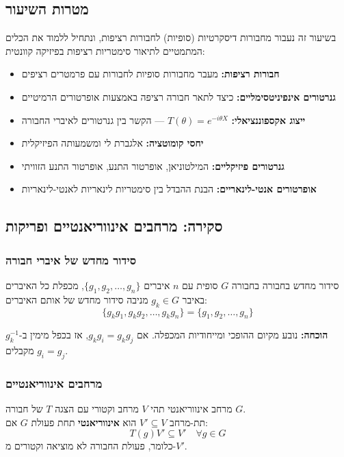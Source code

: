 \subsection*{מטרות השיעור}
בשיעור זה נעבור מחבורות דיסקרטיות (סופיות) לחבורות רציפות, ונתחיל ללמוד את הכלים המתמטיים לתיאור סימטריות רציפות בפיזיקה קוונטית:
\begin{itemize}
    \item \textbf{חבורות רציפות:} מעבר מחבורות סופיות לחבורות עם פרמטרים רציפים
    \item \textbf{גנרטורים אינפיניטסימליים:} כיצד לתאר חבורה רציפה באמצעות אופרטורים הרמיטיים
    \item \textbf{ייצוג אקספוננציאלי:} $T(\theta) = e^{-i\theta X}$ — הקשר בין גנרטורים לאיברי החבורה
    \item \textbf{יחסי קומוטציה:} אלגברת לי ומשמעותה הפיזיקלית
    \item \textbf{גנרטורים פיזיקליים:} המילטוניאן, אופרטור התנע, אופרטור התנע הזוויתי
    \item \textbf{אופרטורים אנטי-לינאריים:} הבנת ההבדל בין סימטריות לינאריות לאנטי-לינאריות
\end{itemize}

\subsection{סקירה: מרחבים אינווריאנטיים ופריקות}

\subsubsection{סידור מחדש של איברי חבורה}

\begin{theorembox}[label=thm:rearrangement]{סידור מחדש בחבורה}
בחבורה $G$ סופית עם $n$ איברים $\{g_1, g_2, \ldots, g_n\}$, מכפלת כל האיברים באיבר $g_k \in G$ מניבה סידור מחדש של אותם האיברים:
\[
\{g_k g_1, g_k g_2, \ldots, g_k g_n\} = \{g_1, g_2, \ldots, g_n\}
\]
\end{theorembox}

\textbf{הוכחה:} נובע מקיום ההופכי ומייחודיות המכפלה. אם $g_k g_i = g_k g_j$, אז בכפל מימין ב-$g_k^{-1}$ מקבלים $g_i = g_j$.

\subsubsection{מרחבים אינווריאנטיים}

\begin{definitionbox}[label=def:invariant_subspace]{מרחב אינווריאנטי}
תהי $V$ מרחב וקטורי עם הצגה $T$ של חבורה $G$. \\
תת-מרחב $V' \subseteq V$ הוא \textbf{אינווריאנטי} תחת פעולת $G$ אם:
\[
T(g) V' \subseteq V' \quad \forall g \in G
\]
כלומר, פעולת החבורה לא מוציאה וקטורים מ-$V'$.
\end{definitionbox}

